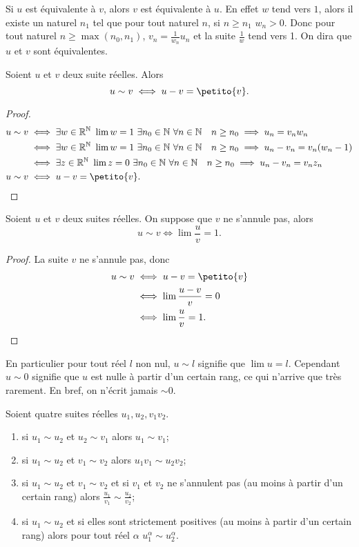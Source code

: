 Si $u$ est équivalente à $v$, alors $v$ est équivalente à $u$. En effet $w$ tend vers $1$, alors il existe un naturel $n_1$ tel que pour tout naturel $n$, si $n \geq n_1$ $w_n >0$. Donc pour tout naturel $n \geq \max(n_0,n_1)$, $v_n = \frac{1}{w_n} u_n$ et la suite $\frac{1}{w}$ tend vers 1. On dira que $u$ et $v$ sont équivalentes.

\begin{prop}
  Soient $u$ et $v$ deux suite réelles. Alors
  \begin{equation}
    u \sim v \iff u-v = \petito{v}.
  \end{equation}
\end{prop}
\begin{proof}
  \begin{align}
    u \sim v & \iff \exists w \in \R^\N \ \lim w =1 \ \exists n_0 \in \N \ \forall n \in \N \quad n \geq n_0 \implies u_n= v_n w_n \\
    & \iff \exists w \in \R^\N \ \lim w =1 \ \exists n_0 \in \N \ \forall n \in \N \quad n \geq n_0 \implies u_n-v_n= v_n (w_n -1) \\
    & \iff \exists z \in \R^\N \ \lim z =0 \ \exists n_0 \in \N \ \forall n \in \N \quad n \geq n_0 \implies u_n-v_n= v_n z_n \\
    u \sim v & \iff u-v = \petito{v}.
  \end{align}
\end{proof}
\begin{prop}
  Soient $u$ et $v$ deux suites réelles. On suppose que $v$ ne s'annule pas, alors
  \begin{equation}
    u \sim v \iff \lim \frac{u}{v}=1.
  \end{equation}
\end{prop}
\begin{proof}
  La suite $v$ ne s'annule pas, donc
  \begin{align}
    u \sim v & \iff u-v = \petito{v} \\
    & \iff \lim \frac{u-v}{v} =0 \\
    & \iff \lim \frac{u}{v} =1.
  \end{align}
\end{proof}
En particulier pour tout réel $l$ non nul, $u \sim l$ signifie que $\lim u =l$. Cependant $u \sim 0$ signifie que $u$ est nulle à partir d'un certain rang, ce qui n'arrive que très rarement. En bref, on n'écrit jamais $\sim 0$.
\begin{prop}
  Soient quatre suites réelles $u_1, u_2, v_1 v_2$.
  \begin{enumerate}
  \item si $u_1 \sim u_2$ et $u_2 \sim v_1$ alors $u_1 \sim v_1$;  
  \item si $u_1 \sim u_2$ et $v_1 \sim v_2$ alors $u_1 v_1 \sim u_2 v_2$;
  \item si $u_1 \sim u_2$ et $v_1 \sim v_2$ et si $v_1$ et $v_2$ ne s'annulent pas (au moins à partir d'un certain rang) alors $\frac{u_1}{v_1} \sim \frac{u_2}{v_2}$;
  \item si $u_1 \sim u_2$ et si elles sont strictement positives (au moins à partir d'un certain rang) alors pour tout réel $\alpha$ $u_1^\alpha \sim u_2^\alpha$.
  \end{enumerate}
\end{prop}
